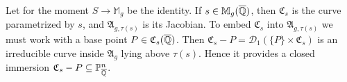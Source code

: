 
Let for the moment $S\rightarrow \mathbb{M}_g$ be the identity.
If $s \in \mathbb{M}_g({\overline{\mathbb{Q}}})$, then $\mathfrak{C}_s$ is the curve
parametrized by $s$, and $\mathfrak{A}_{g,\tau(s)}$ is its Jacobian.
To embed $\mathfrak{C}_s$ into $\mathfrak{A}_{g,\tau(s)}$ we must work with a
base point $P\in
\mathfrak{C}_s({\overline{\mathbb{Q}}})$. Then 
$\mathfrak{C}_s-P = \mathscr{D}_1(\{P\} \times \mathfrak{C}_s)$
is an irreducible curve inside $\mathfrak{A}_g$ lying above $\tau(s)$.
Hence it provides a closed immersion   $\mathfrak{C}_s-P \subseteq
{\mathbb{P}}_{\overline{\mathbb{Q}}}^n$.%


